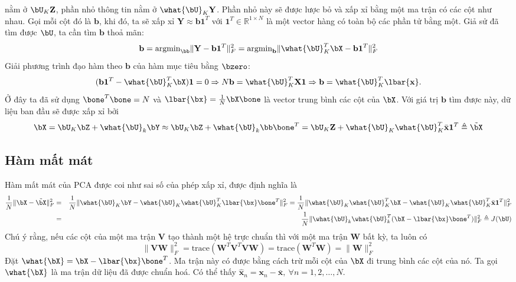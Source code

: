 nằm ở $\bU_K \mathbf{Z}$, phần nhỏ thông tin nằm ở $\what{\bU}_K\mathbf{Y}$.
Phần nhỏ này sẽ được lược bỏ và xấp xỉ bằng một ma trận có các
cột như nhau. Gọi mỗi cột đó là
$\mathbf{b}$, khi đó, ta sẽ xấp xỉ $\mathbf{Y} \approx
\mathbf{b1}^T$ với $\mathbf{1}^T\in \mathbb{R}^{1
\times N}$ là một vector hàng có toàn
bộ các phần tử bằng một. Giả sử đã tìm được $\bU$, ta cần tìm $\mathbf{b}$ thoả mãn:
\begin{equation} 
    \mathbf{b} = \text{argmin}_{\bb} \|\mathbf{Y} - \mathbf{b1}^T\|_F^2 =
    \text{argmin}_{\mathbf{b}} \|\what{\bU}_K^T\bX - \mathbf{b1}^T\|_F^2 
\end{equation} 
Giải phương trình đạo hàm theo $\mathbf{b}$ của hàm mục tiêu bằng $\bzero$: 
\begin{equation} 
    (\mathbf{b1}^T - \what{\bU}_K^T\bX)\mathbf{1} = 0 \Rightarrow N\mathbf{b} = \what{\bU}_K^T \mathbf{X1} \Rightarrow \mathbf{b} = \what{\bU}_K^T \lbar{\mathbf{x}}.
\end{equation} 
Ở đây ta đã sử dụng $\bone^T\bone = N$ và $\lbar{\bx} = \frac{1}{N}\bX\bone$ là
vector trung bình các cột của $\bX$. 
Với giá trị $\mathbf{b}$ tìm được này, dữ liệu ban đầu sẽ được xấp xỉ bởi
\begin{equation} 
\label{eqn:27_10}
\bX = \bU_K \bZ + \what{\bU}_k\bY \approx \bU_K\bZ + \what{\bU}_k \bb\bone^T
= \bU_K \mathbf{Z} + \what{\bU}_K \what{\bU}_K^T\bar{\mathbf{x}}\mathbf{1}^T
\triangleq \tilde{\bX}
\end{equation} 
\subsection{Hàm mất mát}
Hàm mất mát của PCA được coi như sai số của phép xấp xỉ, được định
nghĩa là 
\begin{eqnarray}
\nonumber
\frac{1}{N}\|\bX - \tilde{\bX}\|_F^2 &=& 
\frac{1}{N}\|\what{\bU}_K \bY-  \what{\bU}_K
\what{\bU}_K^T\lbar{\bx}\bone^T\|_F^2 = 
\frac{1}{N}\|\what{\bU}_K \what{\bU}_K^T \bX -  \what{\bU}_K
\what{\bU}_K^T \bar{\mathbf{x}}\mathbf{1}^T\|_F^2\\
\label{eqn:27_11}
&=& \frac{1}{N} \|\what{\bU}_k \what{\bU}_k^T(\bX - \lbar{\bx}\bone^T)\|_F^2
\triangleq J(\bU)
\end{eqnarray}
Chú ý rằng, nếu các cột của một ma trận $\mathbf{V}$ tạo thành một hệ
trực chuẩn thì với một ma trận $\mathbf{W}$ bất kỳ, ta luôn có
\begin{equation} 
    \|\mathbf{VW}\|_F^2 = \text{trace} (\mathbf{W}^T\mathbf{V}^T\mathbf{V} \mathbf{W}) = \text{trace}(\mathbf{W}^T\mathbf{W}) = \|\mathbf{W}\|_F^2 
\end{equation} 
Đặt $\what{\bX} = \bX - \lbar{\bx}\bone^T$. Ma trận này có được bằng cách trừ
mỗi cột của $\bX$ đi trung bình các cột của nó. Ta gọi $\what{\bX}$ là {ma trận dữ liệu đã
được chuẩn hoá}. Có thể thấy $\hat{\mathbf{x}}_n = \mathbf{x}_n -
\bar{\mathbf{x}},~\forall n = 1, 2, \dots, N$.

